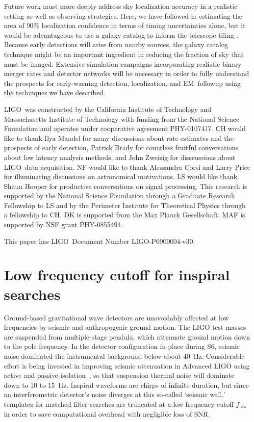\documentclass[preprint2]{aastex}
\newcommand{\EM}{EM}%
\newcommand{\LIGO}{LIGO}%
\begin{document}
Future work must more deeply address sky localization accuracy in a
realistic setting as well as observing strategies. Here, we have followed
\citet{Fairhurst2009} in estimating the area of 90\% localization confidence in
terms of timing uncertainties alone, but it would be advantageous to use a
galaxy catalog to inform the telescope tiling \citep{galaxy-catalog}. Because
early detections will arise from nearby sources, the galaxy catalog technique
might be an important ingredient in reducing the fraction of sky that must be
imaged.  Extensive simulation campaigns incorporating realistic binary merger
rates and detector networks will be necessary in order to fully understand the
prospects for early-warning detection, localization, and \EM\ followup using
the techniques we have described.

\acknowledgements

\LIGO\ was constructed by the California Institute of Technology and
Massachusetts Institute of Technology with funding from the National Science
Foundation and operates under cooperative agreement PHY-0107417.  CH would like
to thank Ilya Mandel for many discussions about rate estimates and the prospects
of early detection, Patrick Brady for countless fruitful conversations about low
latency analysis methods, and John Zweizig for disscussions about \LIGO\ data
acquisition.  NF would like to thank Alessandra Corsi and Larry Price for
illuminating discussions on astronomical motivations.  LS would like thank Shaun
Hooper for productive conversations on signal processing.  This research is
supported by the National Science Foundation through a Graduate Research
Fellowship to LS and by the Perimeter Institute for Theoretical Physics through
a fellowship to CH. DK is supported from the Max Planck Gesellschaft.
MAF is supported by NSF grant PHY-0855494.

This paper has \LIGO\ Document Number {LIGO-P0900004-v30}.

\appendix

\section{\label{sec:low-frequency-cutoff}Low frequency cutoff for inspiral searches}

Ground-based gravitational wave detectors are unavoidably affected at low frequencies by seismic and anthropogenic ground motion.  The LIGO test masses are suspended from multiple-stage pendula, which attenuate ground motion down to the pole frequency.  In the detector configuration in place during S6, seismic noise dominated the instrumental background below about 40~Hz.  Considerable effort is being invested in improving seismic attenuation in Advanced LIGO using active and passive isolation~\citep{0264-9381-27-8-084006}, so that suspension thermal noise will dominate down to 10 to 15~Hz.  Inspiral waveforms are chirps of infinite duration, but since an interferometric detector's noise diverges at this so-called `seismic wall,' templates for matched filter searches are truncated at a low frequency cutoff $f_\mathrm{low}$ in order to save computational overhead with negligible loss of SNR.
\end{document}

